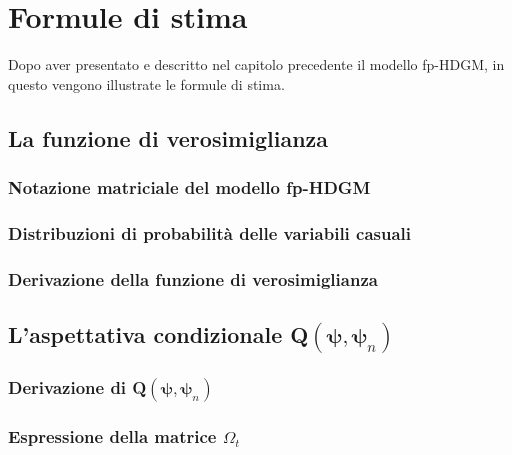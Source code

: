 \chapter[Formule di stima]{Formule di stima}

Dopo aver presentato e descritto nel capitolo precedente il modello fp-HDGM, in questo vengono illustrate le formule di stima. 

\section[La funzione di verosimiglianza]{La funzione di verosimiglianza}
\subsection[Notazione matriciale del modello fp-HDGM]{Notazione matriciale del modello fp-HDGM}
\subsection[Distribuzioni di probabilità delle variabili casuali]{Distribuzioni di probabilità delle variabili casuali}
\subsection[Derivazione della funzione di verosimiglianza]{Derivazione della funzione di verosimiglianza}
\section[L'aspettativa condizionale Q$(\boldsymbol{\psi}, \boldsymbol{\psi}_n)$]{L'aspettativa condizionale Q$(\boldsymbol{\psi}, \boldsymbol{\psi}_n)$}
\subsection[Derivazione di Q$(\boldsymbol{\psi}, \boldsymbol{\psi}_n)$]{Derivazione di Q$(\boldsymbol{\psi}, \boldsymbol{\psi}_n)$}
\subsection[Espressione della matrice $\Omega_t$]{Espressione della matrice $\Omega_t$}
